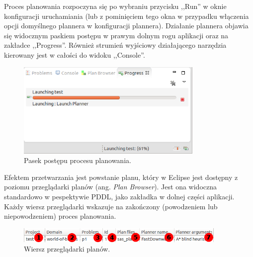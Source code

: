 Proces planowania rozpoczyna się po wybraniu przycisku ,,Run'' w oknie konfiguracji uruchamiania (lub z pominięciem tego okna w przypadku włączenia opcji domyślnego plannera w konfiguracji plannera). Działanie plannera objawia się widocznym paskiem postępu w prawym dolnym rogu aplikacji oraz na zakładce ,,Progress''. Również strumień wyjściowy działającego narzędzia kierowany jest w całości do widoku ,,Console''.

\newpage
\begin{figure}[h!]
    \centering
    \includegraphics[width=0.8\textwidth]{img/run_progress}
    \caption{Pasek postępu procesu planowania.}
    \label{fig:run_progress}
\end{figure}

Efektem przetwarzania jest powstanie planu, który w Eclipse jest dostępny z poziomu przeglądarki planów (ang. \textit{Plan Browser}). Jest ona widoczna standardowo w pespektywie PDDL, jako zakładka w dolnej części aplikacji. Każdy wiersz przeglądarki wskazuje na zakończony (powodzeniem lub niepowodzeniem) proces planowania. 

\begin{figure}[h!]
    \centering
    \includegraphics[width=0.9\textwidth]{img/plan_browser_row}
    \caption{Wiersz przeglądarki planów.}
    \label{fig:plan_browser_row}
\end{figure}


